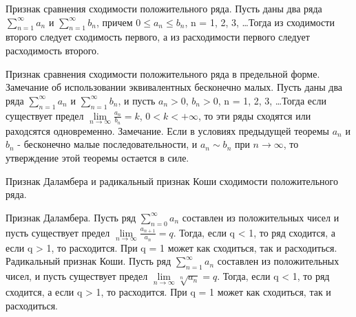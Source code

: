 \documentclass[12pt, a4paper]{article}
\newenvironment{field}{}{\newpage}
\newif\ifnote
\newenvironment{note}{\notetrue}{\notefalse}
\begin{document}
\begin{note}
\begin{field}
Признак сравнения сходимости положительного ряда.
\end{field}
\begin{field}
Пусть даны два ряда $\sum\limits_{n=1}^{\infty}a_n$ и $\sum\limits_{n=1}^{\infty}b_n$, причем $0 	\leq a_{n} \leq b_{n}$, n = 1, 2, 3, \ldots Тогда из сходимости второго следует сходимость первого, а из расходимости первого следует расходимость второго.

\end{field}
\end{note}

\begin{note}
\begin{field}
Признак сравнения сходимости положительного ряда в предельной форме. Замечание об использовании эквивалентных бесконечно малых.
\end{field}
\begin{field}
Пусть даны два ряда $\sum\limits_{n=1}^{\infty}a_{n}$ и $\sum\limits_{n=1}^{\infty}b_n$, и пусть $a_{n} > 0$, $b_{n} > 0$, n = 1, 2, 3, \ldots Тогда если существует предел $\lim\limits_{n \to \infty} \frac{a_{n}}{b_{n}} = k$, $0 < k < +\infty$, то эти ряды сходятся или раходсятся одновременно.
\newline
Замечание. Если в условиях предыдущей теоремы $a_n$ и $b_n$ - бесконечно малые последовательности, и $a_n \sim b_n$ при $n \to \infty$, то утверждение этой теоремы остается в силе.


\end{field}
\end{note}

\begin{note}
\begin{field}
Признак Даламбера и радикальный признак Коши сходимости положительного ряда.
\end{field}
\begin{field}


Признак Даламбера. Пусть ряд  $\sum\limits_{n=0}^{\infty}a_n$ составлен из положительных чисел и пусть существует предел $\lim\limits_{n \to \infty} \frac{a_{n + 1}}{a_{n}} = q$. Тогда, если q < 1, то ряд сходится, а если q > 1, то расходится. При q = 1 может как сходиться, так и расходиться.
\newline
Радикальный признак Коши. Пусть ряд $\sum\limits_{n=1}^{\infty}a_{n}$ составлен из положительных чисел, и пусть существует предел  $\lim\limits_{n \to \infty} \sqrt[n]{a_{n}} = q$. Тогда, если q < 1, то ряд сходится, а если q > 1, то расходится. При q = 1 может как сходиться, так и расходиться.


\end{field}
\end{note}
\end{document}
